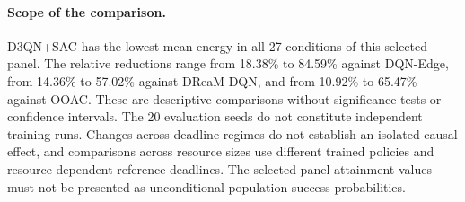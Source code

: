 \paragraph{Scope of the comparison.}
D3QN+SAC has the lowest mean energy in all 27 conditions of this selected panel. The relative reductions range from 18.38\% to 84.59\% against DQN-Edge, from 14.36\% to 57.02\% against DReaM-DQN, and from 10.92\% to 65.47\% against OOAC. These are descriptive comparisons without significance tests or confidence intervals. The 20 evaluation seeds do not constitute independent training runs. Changes across deadline regimes do not establish an isolated causal effect, and comparisons across resource sizes use different trained policies and resource-dependent reference deadlines. The selected-panel attainment values must not be presented as unconditional population success probabilities.
